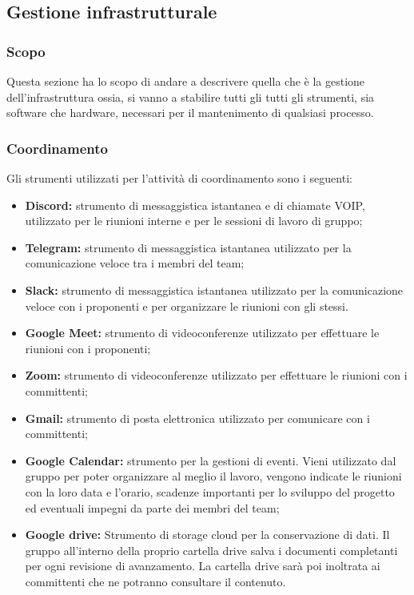 \subsection{Gestione infrastrutturale}
\subsubsection{Scopo}
Questa sezione ha lo scopo di andare a descrivere quella che è la gestione dell'infrastruttura ossia, si vanno a stabilire tutti gli tutti gli strumenti, sia software che hardware, necessari per il mantenimento di qualsiasi processo.
\subsubsection{Coordinamento}
Gli strumenti utilizzati per l'attività di coordinamento sono i seguenti:
\begin{itemize}
    \item \textbf{Discord:} strumento di messaggistica istantanea e di chiamate VOIP, utilizzato per le riunioni interne e per le sessioni di lavoro di gruppo;
    \item \textbf{Telegram:} strumento di messaggistica istantanea utilizzato per la comunicazione veloce tra i membri del team;
    \item \textbf{Slack:} strumento di messaggistica istantanea utilizzato per la comunicazione veloce con i proponenti e per organizzare le riunioni con gli stessi.
    \item \textbf{Google Meet:} strumento di videoconferenze utilizzato per effettuare le riunioni con i proponenti;
    \item \textbf{Zoom:} strumento di videoconferenze utilizzato per effettuare le riunioni con i committenti;
    \item \textbf{Gmail:} strumento di posta elettronica utilizzato per comunicare con i committenti;
    \item \textbf{Google Calendar:} strumento per la gestioni di eventi. Vieni utilizzato dal gruppo per poter organizzare al meglio il lavoro, vengono indicate le riunioni con la loro data e l'orario, scadenze importanti per lo sviluppo del progetto ed eventuali impegni da parte dei membri del team;
    \item \textbf{Google drive:} Strumento di storage cloud per la conservazione di dati. Il gruppo all'interno della proprio cartella drive salva i documenti completanti per ogni revisione di avanzamento. La cartella drive sarà poi inoltrata ai committenti che ne potranno consultare il contenuto.
\end{itemize}
